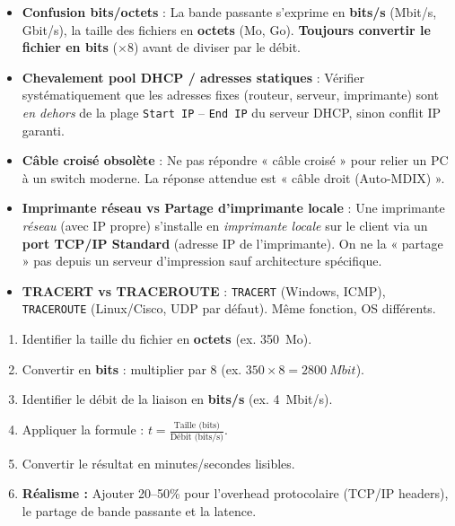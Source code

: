 \documentclass[11pt]{article}
\begin{document}
\begin{attention}
\begin{itemize}
\item \textbf{Confusion bits/octets} : La bande passante s'exprime en \textbf{bits/s} (Mbit/s, Gbit/s), la taille des fichiers en \textbf{octets} (Mo, Go). \textbf{Toujours convertir le fichier en bits} ($\times 8$) avant de diviser par le débit.
\item \textbf{Chevalement pool DHCP / adresses statiques} : Vérifier systématiquement que les adresses fixes (routeur, serveur, imprimante) sont \emph{en dehors} de la plage \texttt{Start IP} -- \texttt{End IP} du serveur DHCP, sinon conflit IP garanti.
\item \textbf{Câble croisé obsolète} : Ne pas répondre « câble croisé » pour relier un PC à un switch moderne. La réponse attendue est « câble droit (Auto-MDIX) ».
\item \textbf{Imprimante réseau vs Partage d'imprimante locale} : Une imprimante \emph{réseau} (avec IP propre) s'installe en \emph{imprimante locale} sur le client via un \textbf{port TCP/IP Standard} (adresse IP de l'imprimante). On ne la « partage » pas depuis un serveur d'impression sauf architecture spécifique.
\item \textbf{TRACERT vs TRACEROUTE} : \texttt{TRACERT} (Windows, ICMP), \texttt{TRACEROUTE} (Linux/Cisco, UDP par défaut). Même fonction, OS différents.
\end{itemize}
\end{attention}

\begin{methode}
\begin{enumerate}
\item Identifier la taille du fichier en \textbf{octets} (ex. \SI{350}{Mo}).
\item Convertir en \textbf{bits} : multiplier par 8 (ex. $350 \times 8 = \SI{2800}{Mbit}$).
\item Identifier le débit de la liaison en \textbf{bits/s} (ex. \SI{4}{Mbit/s}).
\item Appliquer la formule : $t = \frac{\text{Taille (bits)}}{\text{Débit (bits/s)}}$.
\item Convertir le résultat en minutes/secondes lisibles.
\item \textbf{Réalisme :} Ajouter 20--50\% pour l'overhead protocolaire (TCP/IP headers), le partage de bande passante et la latence.
\end{enumerate}
\end{methode}
\end{document}
